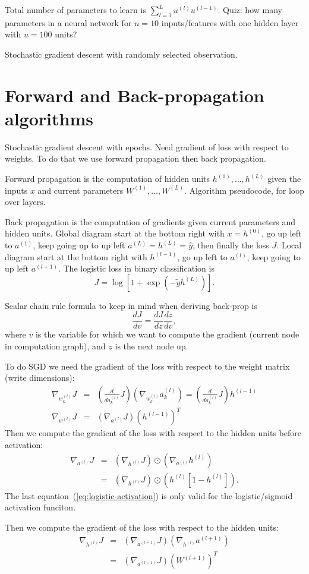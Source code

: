 \documentclass{article}
\begin{document}
Total number of parameters to learn is
$\sum_{l=1}^L u^{(l)} u^{(l-1)}.$ Quiz: how many parameters in a
neural network for $n=10$ inputs/features with one hidden layer with
$u=100$ units?

Stochastic gradient descent with randomly selected observation.

\section{Forward and Back-propagation algorithms}

Stochastic gradient descent with epochs. Need gradient of loss with
respect to weights. To do that we use forward propagation then back
propagation.

Forward propagation is the computation of hidden units
$h^{(1)},\dots,h^{(L)}$ given the inputs $x$ and current parameters
$W^{(1)},\dots,W^{(L)}$. Algorithm pseudocode, for loop over layers.

Back propagation is the computation of gradients given current
parameters and hidden units. Global diagram start at the bottom right
with $x=h^{(0)}$, go up left to $a^{(1)}$, keep going up to up left
$a^{(L)}=h^{(L)}=\hat y$, then finally the loss $J$. Local diagram
start at the bottom right with $h^{(l-1)}$, go up left to $a^{(l)}$,
keep going to up left $a^{(l+1)}$. The logistic loss in binary
classification is
\begin{equation}
  J = \log[1+\exp(-\tilde y h^{(L)})].
\end{equation}

Scalar chain rule formula to keep in mind when deriving back-prop is
\begin{equation}
  \frac{d J}{d v} = \frac{d J}{d z} \frac{d z}{d v},
\end{equation}
where $v$ is the variable for which we want to compute the gradient
(current node in computation graph), and $z$ is the next node up.

To do SGD we need the gradient of the loss with respect to the weight
matrix (write dimensions):
\begin{eqnarray}
  \nabla_{w_k^{(l)}} J
  &=& \left( \frac{d}{d a_k^{(l)}} J \right)
      \left( \nabla_{w_k^{(l)}} a_k^{(l)} \right) =
      \left( \frac{d}{d a_k^{(l)}} J \right)
      h^{(l-1)}\\
  \nabla_{w^{(l)}} J
  &=& \left(\nabla_{a^{(l)}} J\right)
      \left( h^{(l-1)} \right)^T
\end{eqnarray}
Then we compute the gradient of the loss with respect to the hidden
units before activation:
\begin{eqnarray}
  \nabla_{a^{(l)}} J
  &=& \left(\nabla_{h^{(l)}} J\right) \odot
      \left(\nabla_{a^{(l)}} h^{(l)} \right) \\
  &=& \left(\nabla_{h^{(l)}} J\right) \odot \left(h^{(l)}[1-h^{(l)}]\right).\label{eq:logistic-activation}
\end{eqnarray}
The last equation~(\ref{eq:logistic-activation}) is only valid for the
logistic/sigmoid activation funciton.

Then we compute the gradient of the loss with respect to the hidden
units:
\begin{eqnarray}
  \nabla_{h^{(l)}} J
  &=& \left(\nabla_{a^{(l+1)}} J\right)
      \left(\nabla_{h^{(l)}} a^{(l+1)}\right)\\
  &=& \left(\nabla_{a^{(l+1)}} J\right)
      \left(W^{(l+1)}\right)^T
\end{eqnarray}
\end{document}
